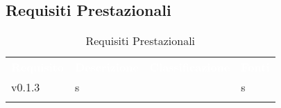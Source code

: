 \subsection{Requisiti Prestazionali}




\renewcommand{\arraystretch}{1.5}
\begin{longtable}{ m{}<{\centering}  m{}<{\centering}  m{}<{\centering}  m{}<{\centering}}
	\rowcolor{darkblue}
	\textcolor{white}{\textbf{Requisito}} &\textcolor{white}{\textbf{Descrizione}}& \textcolor{white}{\textbf{Classificazione}} & \textcolor{white}{\textbf{Fonti}}\\ 

	v0.1.3 & s & \Ob & s\\		

	\caption{Requisiti Prestazionali}
\end{longtable}